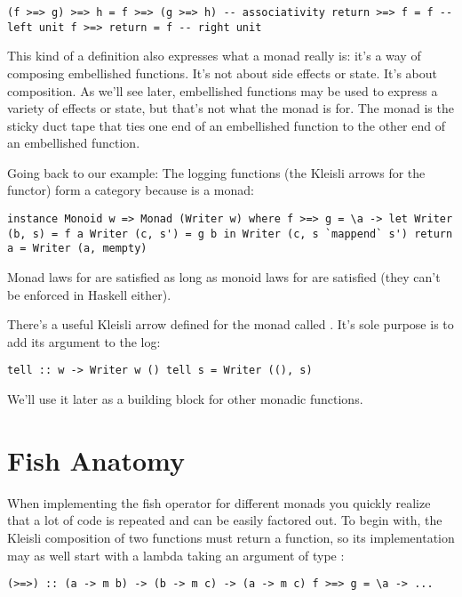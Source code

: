\begin{verbatim}
(f >=> g) >=> h = f >=> (g >=> h) -- associativity return >=> f = f -- left unit f >=> return = f -- right unit
\end{verbatim}

This kind of a definition also expresses what a monad really is: it's a
way of composing embellished functions. It's not about side effects or
state. It's about composition. As we'll see later, embellished functions
may be used to express a variety of effects or state, but that's not
what the monad is for. The monad is the sticky duct tape that ties one
end of an embellished function to the other end of an embellished
function.

Going back to our  example: The logging functions (the
Kleisli arrows for the  functor) form a category because
 is a monad:

\begin{verbatim}
instance Monoid w => Monad (Writer w) where f >=> g = \a -> let Writer (b, s) = f a Writer (c, s') = g b in Writer (c, s `mappend` s') return a = Writer (a, mempty)
\end{verbatim}

Monad laws for  are satisfied as long as monoid laws
for  are satisfied (they can't be enforced in Haskell either).

There's a useful Kleisli arrow defined for the  monad
called . It's sole purpose is to add its argument to the
log:

\begin{verbatim}
tell :: w -> Writer w () tell s = Writer ((), s)
\end{verbatim}

We'll use it later as a building block for other monadic functions.

\section{Fish Anatomy}\label{fish-anatomy}

When implementing the fish operator for different monads you quickly
realize that a lot of code is repeated and can be easily factored out.
To begin with, the Kleisli composition of two functions must return a
function, so its implementation may as well start with a lambda taking
an argument of type :

\begin{verbatim}
(>=>) :: (a -> m b) -> (b -> m c) -> (a -> m c) f >=> g = \a -> ...
\end{verbatim}

